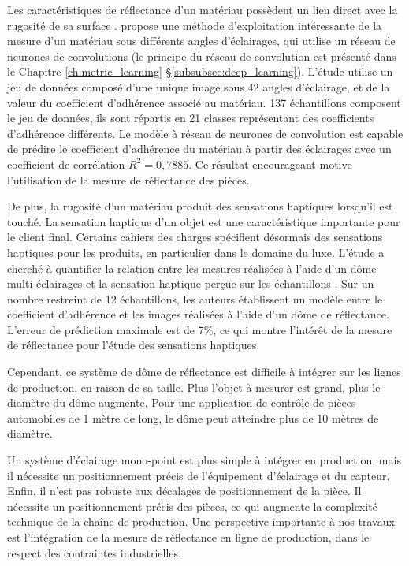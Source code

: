 Les caractéristiques de réflectance d'un matériau possèdent un lien direct avec la rugosité de sa surface \cite{torrance_theory_1967}.
\citeauthor{zhang_friction_2016} \cite{zhang_friction_2016} propose une méthode d'exploitation intéressante de la mesure d'un matériau sous différents angles d'éclairages, qui utilise un réseau de neurones de convolutions  (le principe du réseau de convolution est présenté dans le Chapitre \ref{ch:metric_learning} §\ref{subsubsec:deep_learning}).
L'étude utilise un jeu de données composé d'une unique image sous 42 angles d'éclairage, et de la valeur du coefficient d'adhérence associé au matériau.
137 échantillons composent le jeu de données, ils sont répartis en 21 classes représentant des coefficients d'adhérence différents.
Le modèle à réseau de neurones de convolution est capable de prédire le coefficient d'adhérence du matériau à partir des éclairages avec un coefficient de corrélation $R^2 = 0,7885$.
Ce résultat encourageant motive l'utilisation de la mesure de réflectance des pièces.

De plus, la rugosité d'un matériau produit des sensations haptiques lorsqu'il est touché.
La sensation haptique d'un objet est une caractéristique importante pour le client final.
Certains cahiers des charges spécifient désormais des sensations haptiques pour les produits, en particulier dans le domaine du luxe.
L'étude  a cherché à quantifier la relation entre les mesures réalisées à l'aide d'un dôme multi-éclairages et la sensation haptique perçue sur les échantillons \cite{lacombe_see_2017}.
Sur un nombre restreint de 12 échantillons, les auteurs établissent un modèle entre le coefficient d'adhérence et les images réalisées à l'aide d'un dôme de réflectance.
L’erreur de prédiction maximale est de 7\%, ce qui montre l'intérêt de la mesure de réflectance pour l'étude des sensations haptiques. 

Cependant, ce système de dôme de réflectance est difficile à intégrer sur les lignes de production, en raison de sa taille.
Plus l'objet à mesurer est grand, plus le diamètre du dôme augmente.
Pour une application de contrôle de pièces automobiles de 1 mètre de long, le dôme peut atteindre plus de 10 mètres de diamètre.

Un système d'éclairage mono-point est plus simple à intégrer en production, mais il nécessite un positionnement précis de l'équipement d'éclairage et du capteur.
Enfin, il n’est pas robuste aux décalages de positionnement de la pièce.
Il nécessite un positionnement précis des pièces, ce qui augmente la complexité technique de la chaîne de production.
Une perspective importante à nos travaux est l'intégration de la mesure de réflectance en ligne de production, dans le respect des contraintes industrielles.

